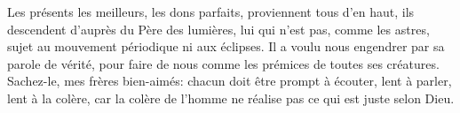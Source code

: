 Les présents les meilleurs, les dons parfaits, proviennent tous d’en haut,
	ils descendent d’auprès du Père des lumières,
	lui qui n’est pas, comme les astres,
	sujet au mouvement périodique ni aux éclipses.
Il a voulu nous engendrer par sa parole de vérité,
	pour faire de nous comme les prémices de toutes ses créatures.
Sachez-le, mes frères bien-aimés:
	chacun doit être prompt à écouter, lent à parler, lent à la colère,
	car la colère de l’homme ne réalise pas ce qui est juste selon Dieu.
